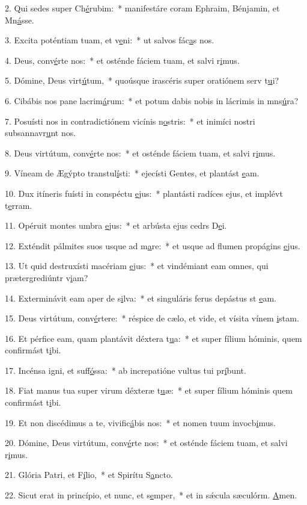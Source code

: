2. Qui sedes super Ch\uline{é}rubim:~* manifestáre coram Ephraim, Bénjamin, et Mn\uline{á}sse.\par 
3. Excita poténtiam tuam, et v\uline{e}ni:~* ut salvos fác\uline{a}s nos.\par 
4. Deus, conv\uline{é}rte nos:~* et osténde fáciem tuam, et salvi r\uline{i}mus.\par 
5. Dómine, Deus virt\uline{ú}tum,~* quoúsque irascéris super oratiónem serv t\uline{u}i?\par 
6. Cibábis nos pane lacrim\uline{á}rum:~* et potum dabis nobis in lácrimis in mns\uline{ú}ra?\par 
7. Posuísti nos in contradictiónem vicínis n\uline{o}stris:~* et inimíci nostri subsannavr\uline{u}nt nos.\par 
8. Deus virtútum, conv\uline{é}rte nos:~* et osténde fáciem tuam, et salvi r\uline{i}mus.\par 
9. Víneam de Ægýpto transtul\uline{í}sti:~* ejecísti Gentes, et plantást \uline{e}am.\par 
10. Dux itíneris fuísti in conspéctu \uline{e}jus:~* plantásti radíces ejus, et implévt t\uline{e}rram.\par 
11. Opéruit montes umbra \uline{e}jus:~* et arbústa ejus cedrs D\uline{e}i.\par 
12. Exténdit pálmites suos usque ad m\uline{a}re:~* et usque ad flumen propágins \uline{e}jus.\par 
13. Ut quid destruxísti macériam \uline{e}jus:~* et vindémiant eam omnes, qui prætergrediúntr v\uline{i}am?\par 
14. Exterminávit eam aper de s\uline{i}lva:~* et singuláris ferus depástus st \uline{e}am.\par 
15. Deus virtútum, conv\uline{é}rtere:~* réspice de cælo, et vide, et vísita vínem \uline{i}stam.\par 
16. Et pérfice eam, quam plantávit déxtera t\uline{u}a:~* et super fílium hóminis, quem confirmást t\uline{i}bi.\par 
17. Incénsa igni, et suff\uline{ó}ssa:~* ab increpatióne vultus tui pr\uline{í}bunt.\par 
18. Fiat manus tua super virum déxteræ t\uline{u}æ:~* et super fílium hóminis quem confirmást t\uline{i}bi.\par 
19. Et non discédimus a te, vivific\uline{á}bis nos:~* et nomen tuum invocb\uline{i}mus.\par 
20. Dómine, Deus virtútum, conv\uline{é}rte nos:~* et osténde fáciem tuam, et salvi r\uline{i}mus.\par 
21. Glória Patri, et F\uline{í}lio,~* et Spirítu S\uline{a}ncto.\par 
22. Sicut erat in princípio, et nunc, et s\uline{e}mper,~* et in sǽcula sæculórm. \uline{A}men.\par 
